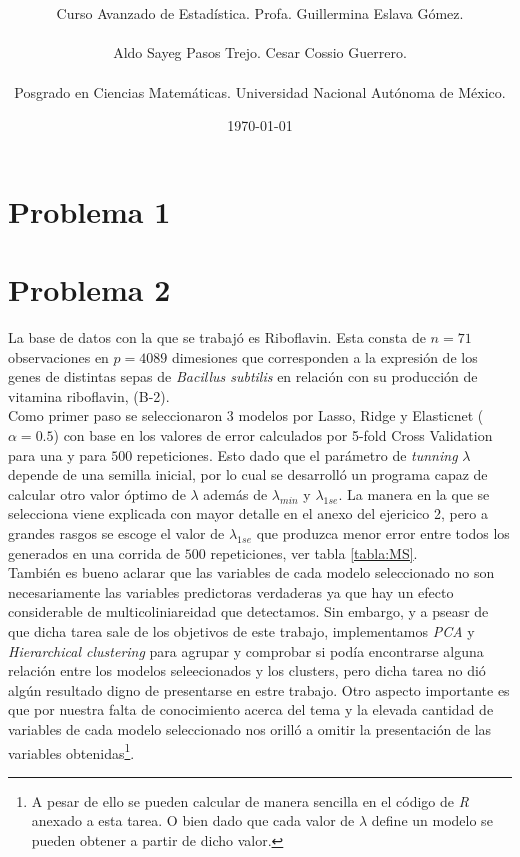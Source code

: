 \documentclass[11pt]{article}
\title{\textbf{\work}}
\author{Curso Avanzado de Estadística. Profa. Guillermina Eslava Gómez.\\ \\ Aldo Sayeg Pasos Trejo. Cesar Cossio Guerrero. \\ \\ Posgrado en Ciencias Matemáticas. Universidad Nacional Autónoma de México. }
\date{\today}
\begin{document}
\maketitle
\section{Problema 1}
\section{Problema 2}

La base de datos con la que se trabajó es Riboflavin. Esta consta de $n=71$ observaciones en $p=4089$ dimesiones que corresponden a la expresión de los genes de distintas sepas de \emph{Bacillus subtilis} en relación con su producción de vitamina riboflavin, (B-2). \\

Como primer paso se seleccionaron 3 modelos por Lasso, Ridge y Elasticnet ($\alpha=0.5$) con base en los valores de error calculados por 5-fold Cross Validation para una y para $500$ repeticiones. Esto dado que el parámetro de \emph{tunning} $\lambda$ depende de una semilla inicial, por lo cual se desarrolló un programa capaz de calcular otro valor óptimo de $\lambda$ además de $\lambda_{min}$ y $\lambda_{1se}$. La manera en la que se selecciona viene explicada con mayor detalle en el anexo del ejericico 2, pero a grandes rasgos se escoge el valor de $\lambda_{1se}$ que produzca menor error entre todos los generados en una corrida de $500$ repeticiones, ver tabla \ref{tabla:MS}. \\

También es bueno aclarar que las variables de cada modelo seleccionado no son necesariamente las variables predictoras verdaderas ya que hay un efecto considerable de multicoliniareidad que detectamos. Sin embargo, y a pseasr de que dicha tarea sale de los objetivos de este trabajo, implementamos \emph{PCA} y \emph{Hierarchical clustering} para agrupar y comprobar si podía encontrarse alguna relación entre los modelos seleecionados y los clusters, pero dicha tarea no dió algún resultado digno de presentarse en estre trabajo. Otro aspecto importante es que por nuestra falta de conocimiento acerca del tema y la elevada cantidad de variables de cada modelo seleccionado nos orilló a omitir la presentación de las variables obtenidas\footnote{A pesar de ello se pueden calcular de manera sencilla en el código de \emph{R} anexado a esta tarea. O bien dado que cada valor de $\lambda$ define un modelo se pueden obtener a partir de dicho valor.}. \\
\end{document}
